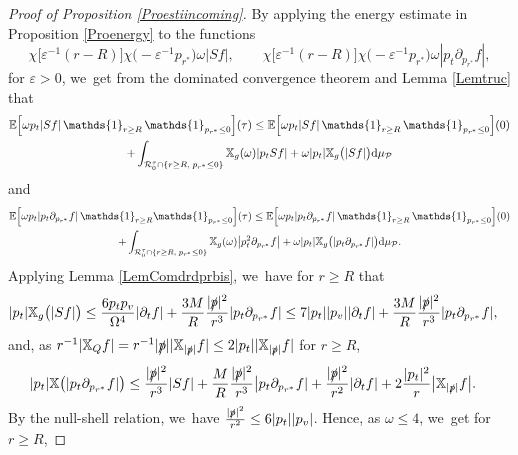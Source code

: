 \documentclass[10pt]{amsart}
\let\epsilon\varepsilon
\theoremstyle{plain}
\theoremstyle{definition}
\newcommand\T{{\mathbb{X}}}
\newcommand\dr{{\mathrm{d}}}
\begin{document}
\begin{proof}[Proof of Proposition \ref{Proestiincoming}]
By applying the energy estimate in Proposition \ref{Proenergy} to the functions
\[
\chi \bigl[ \epsilon^{-1}(r-R) \bigr] \chi \bigl(- \epsilon^{-1} p_{r^*} \bigr) \omega |Sf|,\qquad \chi \bigl[ \epsilon^{-1}(r-R) \bigr] \chi \bigl(- \epsilon^{-1} p_{r^*} \bigr)\omega|p_t \partial_{p_{r^*}} f|,
\]
for $\epsilon >0$, we~get from the dominated convergence theorem and Lemma \ref{Lemtruc} that
\begin{multline*}
\mathbb{E} \Bigl[ \omega p_t |Sf| \, \mathds{1}_{r \geq R} \, \mathds{1}_{p_{r^*} \leq 0} \Bigr](\tau)
\leq \mathbb{E} \Bigl[ \omega p_t |Sf| \, \mathds{1}_{r \geq R} \, \mathds{1}_{p_{r^*} \leq 0} \Bigr](0) \\
+\int_{\mathcal{R}_0^\tau \cap \{r \geq R, \; p_{r^*} \leq 0 \}} \T_g(\omega) |p_t Sf| +\omega|p_t| \T_g\bigl(|Sf| \bigr) \dr \mu_{\mathcal{P}}
\end{multline*}
and
\begin{multline*}
\mathbb{E} \Bigl[ \omega p_t |p_t \partial_{p_{r^*}} f| \, \mathds{1}_{r \geq R} \mathds{1}_{p_{r^*} \leq 0} \Bigr](\tau) \leq \mathbb{E} \Bigl[ \omega p_t |p_t \partial_{p_{r^*}} f|\, \mathds{1}_{r \geq R} \, \mathds{1}_{p_{r^*} \leq 0} \Bigr](0)\\
+\int_{\mathcal{R}_0^\tau \cap \{r \geq R, \; p_{r^*} \leq 0 \}} \T_g(\omega) \big|p_t^2 \partial_{p_{r^*}}f \big| +\omega|p_t| \T_g\bigl(|p_t \partial_{p_{r^*}}f| \bigr) \dr \mu_{\mathcal{P}}.
\end{multline*}
Applying Lemma \ref{LemComdrdprbis}, we~have for $r \geq R$ that
\begin{align*}
|p_t| \T_g \bigl(|S f | \bigr) & \leq \frac{6p_tp_v}{ \Omega^4}|\partial_t f| +\frac{3M}{R} \frac{ |\slashed{p}|^2}{r^3} |p_t \partial_{p_{r^*}} f | \leq 7 |p_t||p_v||\partial_t f| +\frac{3M}{R} \frac{ |\slashed{p}|^2}{r^3} |p_t \partial_{p_{r^*}} f |,
\end{align*}
and, as $r^{-1} |\T_Q f| = r^{-1} |\slashed{p}| |\T_{|\slashed{p}|} f| \leq 2 |p_t||\T_{|\slashed{p}|} f|$ for $r \geq R$,
\begin{align*}
|p_t|\T \bigl(|p_t \partial_{p_{r^*}} f | \bigr) & \leq \frac{|\slashed{p}|^2}{r^3 } |Sf|+\frac{M}{R}\frac{|\slashed{p}|^2}{r^3}\big|p_{t} \partial_{p_{r^*}}f |+\frac{|\slashed{p}|^2}{r^2 } | \partial_t f|+2\frac{|p_{t}|^2}{r } \big|\T_{|\slashed{p}|} f \big|.
\end{align*}
By the null-shell relation, we~have $\frac{|\slashed{p}|^2}{r^2} \leq 6 |p_t||p_v|$. Hence, as $\omega \leq 4$, we~get for $r \geq R$,

\end{proof}
\end{document}

